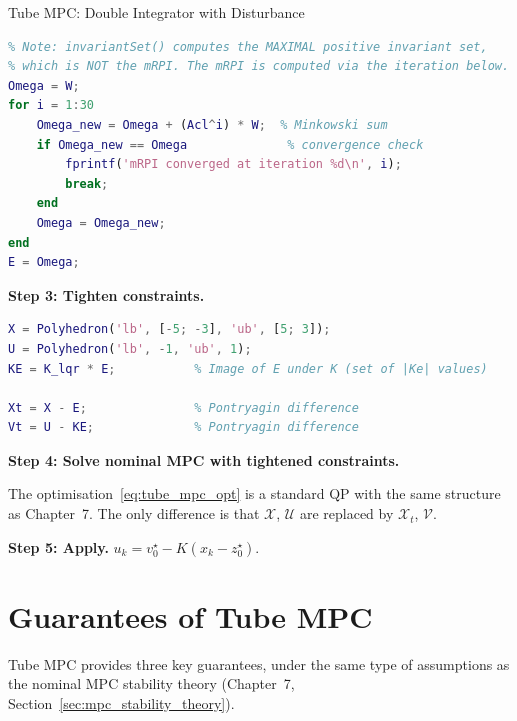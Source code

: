 \begin{examplebox}{Tube MPC: Double Integrator with Disturbance}
\begin{lstlisting}[language=Matlab]
% Compute mRPI set (iterative Minkowski sum approximation)
% Note: invariantSet() computes the MAXIMAL positive invariant set,
% which is NOT the mRPI. The mRPI is computed via the iteration below.
Omega = W;
for i = 1:30
    Omega_new = Omega + (Acl^i) * W;  % Minkowski sum
    if Omega_new == Omega              % convergence check
        fprintf('mRPI converged at iteration %d\n', i);
        break;
    end
    Omega = Omega_new;
end
E = Omega;
\end{lstlisting}

	\textbf{Step 3: Tighten constraints.}
\begin{lstlisting}[language=Matlab]
X = Polyhedron('lb', [-5; -3], 'ub', [5; 3]);
U = Polyhedron('lb', -1, 'ub', 1);
KE = K_lqr * E;           % Image of E under K (set of |Ke| values)

Xt = X - E;               % Pontryagin difference
Vt = U - KE;              % Pontryagin difference
\end{lstlisting}

	\textbf{Step 4: Solve nominal MPC with tightened constraints.}

	The optimisation~\eqref{eq:tube_mpc_opt} is a standard QP with the same structure as Chapter~7. The only difference is that $\mathcal{X}$, $\mathcal{U}$ are replaced by $\mathcal{X}_t$, $\mathcal{V}$.

	\textbf{Step 5: Apply.} $u_k = v_0^\star - K(x_k - z_0^\star)$.
\end{examplebox}


\section{Guarantees of Tube MPC}
\label{sec:tube_guarantees}

Tube MPC provides three key guarantees, under the same type of assumptions as the nominal MPC stability theory (Chapter~7, Section~\ref{sec:mpc_stability_theory}).

